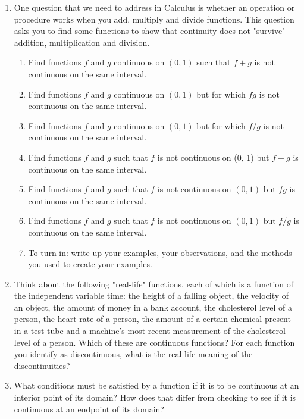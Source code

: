 \begin{enumerate}
\item  One question that we need to address in Calculus is whether an operation or procedure works when you add, multiply and divide functions.  This question asks you to find some functions to show that continuity does not "survive" addition, multiplication and division. 
\begin{enumerate} 
\item Find functions $f$ and $g$   continuous on   $(0, 1)$ such that $f + g$ is not continuous on the same interval.\\
\item Find functions $f$ and $g$   continuous on   $(0, 1)$ but for which $fg$ is not continuous on the same interval.\\
\item Find functions $f$ and $g$   continuous on   $(0, 1)$ but for which $f /g$ is not continuous on the same interval.\\ 
\item Find functions $ f$ and $g$ such that $f$ is not continuous on   (0, 1) but $f + g$ is continuous on the same interval.\\ 
\item Find functions $f$ and $g$ such that $f$ is not continuous on   $(0, 1)$ but $fg$ is continuous on the same interval.\\ 
\item Find functions $f$ and $g$ such that $f$ is not continuous on   $(0, 1)$ but $f/g$ is continuous on the same interval.\\ 
\item To turn in:  write up your examples, your observations, and the methods you used to create your examples. 
\end{enumerate}

\item  Think about the following "real-life" functions, each of which is a function of the independent variable time:  the height of a falling object, the velocity of an object, the amount of money in a bank account, the cholesterol level of a person, the heart rate of a person, the amount of a certain chemical present in a test tube and a machine's most recent measurement of the cholesterol level of a person.  Which of these are continuous functions?  For each function you identify as discontinuous, what is the real-life meaning of the discontinuities?  \cite{SM} 

\item  What conditions must be satisfied by a function if it is to be continuous at an interior point of its domain?  How does that differ from checking to see if it is continuous at an endpoint of its domain?  \cite{FWG} 


\end{enumerate}
